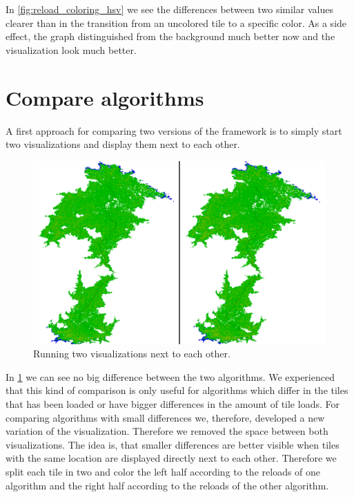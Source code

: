 \documentclass
[
    paper = a4,
    pagesize,
    12 pt,
    oneside,                       %
    open = right,
    DIV = calc,
    BCOR = 0 mm,                   %
    bibtotoc
]
{scrbook}
\begin{document}
In \cref{fig:reload_coloring_hsv} we see the differences between two similar values clearer than in the transition from an uncolored tile to a specific color.
As a side effect, the graph distinguished from the background much better now and the visualization look much better.

\section{Compare algorithms} \label{compare}

A first approach for comparing two versions of the framework is to simply start two visualizations and display them next to each other.

\begin{figure}[H]
    \includegraphics[width=\textwidth]{Images/vis-compare-two.png}
\caption[]{Running two visualizations next to each other.}
\label{fig:two_visualization}
\end{figure}

In \cref{fig:two_visualization} we can see no big difference between the two algorithms.
We experienced that this kind of comparison is only useful for algorithms which differ in the tiles that has been loaded or have bigger differences in the amount of tile loads.
For comparing algorithms with small differences we, therefore, developed a new variation of the visualization.
Therefore we removed the space between both visualizations.
The idea is, that smaller differences are better visible when tiles with the same location are displayed directly next to each other.
Therefore we split each tile in two and color the left half according to the reloads of one algorithm and the right half according to the reloads of the other algorithm.
\end{document}
